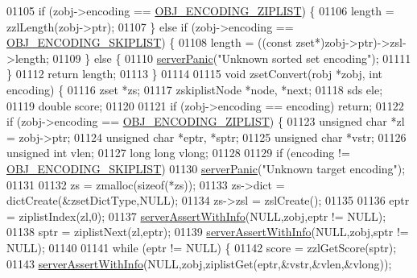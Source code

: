 \begin{DoxyCode}
01105     \textcolor{keywordflow}{if} (zobj->encoding == \hyperlink{server_8h_aabf064ede983103f1fd0df2086e84eee}{OBJ\_ENCODING\_ZIPLIST}) \{
01106         length = zzlLength(zobj->ptr);
01107     \} \textcolor{keywordflow}{else} \textcolor{keywordflow}{if} (zobj->encoding == \hyperlink{server_8h_acfb35db5cb30ed113ed23aeb1a224c4c}{OBJ\_ENCODING\_SKIPLIST}) \{
01108         length = ((\textcolor{keyword}{const} zset*)zobj->ptr)->zsl->length;
01109     \} \textcolor{keywordflow}{else} \{
01110         \hyperlink{server_8h_a11cc378e7778a830b41240578de3b204}{serverPanic}(\textcolor{stringliteral}{"Unknown sorted set encoding"});
01111     \}
01112     \textcolor{keywordflow}{return} length;
01113 \}
01114 
01115 \textcolor{keywordtype}{void} zsetConvert(robj *zobj, \textcolor{keywordtype}{int} encoding) \{
01116     zset *zs;
01117     zskiplistNode *node, *next;
01118     sds ele;
01119     \textcolor{keywordtype}{double} score;
01120 
01121     \textcolor{keywordflow}{if} (zobj->encoding == encoding) \textcolor{keywordflow}{return};
01122     \textcolor{keywordflow}{if} (zobj->encoding == \hyperlink{server_8h_aabf064ede983103f1fd0df2086e84eee}{OBJ\_ENCODING\_ZIPLIST}) \{
01123         \textcolor{keywordtype}{unsigned} \textcolor{keywordtype}{char} *zl = zobj->ptr;
01124         \textcolor{keywordtype}{unsigned} \textcolor{keywordtype}{char} *eptr, *sptr;
01125         \textcolor{keywordtype}{unsigned} \textcolor{keywordtype}{char} *vstr;
01126         \textcolor{keywordtype}{unsigned} \textcolor{keywordtype}{int} vlen;
01127         \textcolor{keywordtype}{long} \textcolor{keywordtype}{long} vlong;
01128 
01129         \textcolor{keywordflow}{if} (encoding != \hyperlink{server_8h_acfb35db5cb30ed113ed23aeb1a224c4c}{OBJ\_ENCODING\_SKIPLIST})
01130             \hyperlink{server_8h_a11cc378e7778a830b41240578de3b204}{serverPanic}(\textcolor{stringliteral}{"Unknown target encoding"});
01131 
01132         zs = zmalloc(\textcolor{keyword}{sizeof}(*zs));
01133         zs->dict = dictCreate(&zsetDictType,NULL);
01134         zs->zsl = zslCreate();
01135 
01136         eptr = ziplistIndex(zl,0);
01137         \hyperlink{server_8h_a7308f76cbff9a8d3797fe78190b91282}{serverAssertWithInfo}(NULL,zobj,eptr != NULL);
01138         sptr = ziplistNext(zl,eptr);
01139         \hyperlink{server_8h_a7308f76cbff9a8d3797fe78190b91282}{serverAssertWithInfo}(NULL,zobj,sptr != NULL);
01140 
01141         \textcolor{keywordflow}{while} (eptr != NULL) \{
01142             score = zzlGetScore(sptr);
01143             \hyperlink{server_8h_a7308f76cbff9a8d3797fe78190b91282}{serverAssertWithInfo}(NULL,zobj,ziplistGet(eptr,&vstr,&vlen,&vlong));

\end{DoxyCode}
